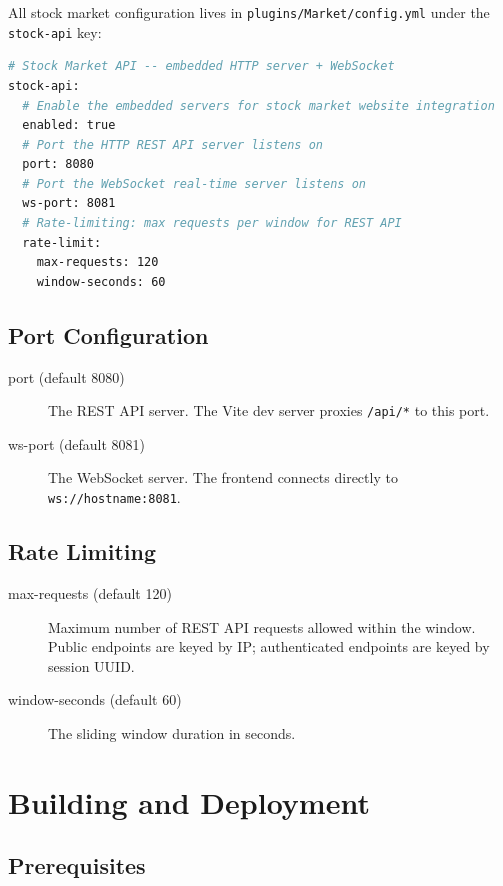 \documentclass[12pt,a4paper]{report}
\begin{document}
All stock market configuration lives in \texttt{plugins/Market/config.yml}
under the \texttt{stock-api} key:

\begin{lstlisting}[language=sh, caption=config.yml stock-api section]
# Stock Market API -- embedded HTTP server + WebSocket
stock-api:
  # Enable the embedded servers for stock market website integration
  enabled: true
  # Port the HTTP REST API server listens on
  port: 8080
  # Port the WebSocket real-time server listens on
  ws-port: 8081
  # Rate-limiting: max requests per window for REST API
  rate-limit:
    max-requests: 120
    window-seconds: 60
\end{lstlisting}

\section{Port Configuration}

\begin{description}
\item[port (default 8080)] The REST API server. The Vite dev server proxies
  \texttt{/api/*} to this port.
\item[ws-port (default 8081)] The WebSocket server. The frontend connects
  directly to \texttt{ws://hostname:8081}.
\end{description}

\section{Rate Limiting}

\begin{description}
\item[max-requests (default 120)] Maximum number of REST API requests allowed
  within the window. Public endpoints are keyed by IP; authenticated endpoints
  are keyed by session UUID.
\item[window-seconds (default 60)] The sliding window duration in seconds.
\end{description}

\chapter{Building and Deployment}

\section{Prerequisites}
\end{document}
